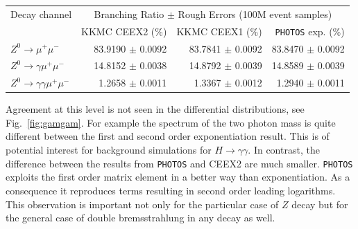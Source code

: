 \documentclass[]{Photos_interface_design}
\begin{document}
\begin{table}
\centering 
\begin{tabular}{lrrr} 
\toprule 
Decay channel &\multicolumn{3}{c}{ Branching Ratio $\pm$ Rough Errors   (100M event samples)} \\ 
      & {KKMC CEEX2} (\%) & {KKMC CEEX1} (\%)& {\tt PHOTOS} exp. (\%)\\ 
\midrule
 {$Z^{0} \rightarrow \mu^{+} \mu^{-} $} & {83.9190 $\pm$  0.0092} &{  83.7841 $\pm$  0.0092} & 83.8470 $\pm$ 0.0092\\ 
 {$Z^{0} \rightarrow \gamma \mu^{+} \mu^{-} $} & {14.8152 $\pm$  0.0038} &{  14.8792 $\pm$  0.0039} & 14.8589 $\pm$ 0.0039 \\ 
{$Z^{0} \rightarrow \gamma \gamma \mu^{+} \mu^{-} $} & { 1.2658 $\pm$  0.0011} &{   1.3367 $\pm$  0.0012} & 1.2940 $\pm$ 0.0011\\ 
\bottomrule
\end{tabular}
\end{table}

Agreement at this level is not seen in the differential distributions, see Fig.~\ref{fig:gamgam}. For example the spectrum of 
the two photon mass is quite different between the first and second order 
exponentiation result. This is of potential interest for background simulations 
for $H \to \gamma \gamma$. In contrast, the difference between the results from {\tt PHOTOS} and CEEX2 are much smaller. {\tt PHOTOS} exploits the first order matrix element 
in a better way than exponentiation. As a consequence it reproduces terms resulting in second order leading logarithms. This observation is important not only for 
the particular case of $Z$ decay but for the general case of double bremsstrahlung in any decay as well.
\end{document}

